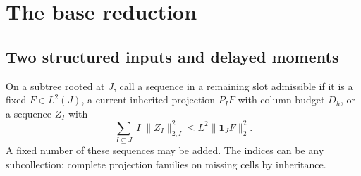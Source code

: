 \documentclass[11pt]{article}
\theoremstyle{definition}
\newcommand{\one}{\mathbf 1}
\numberwithin{equation}{section}
\begin{document}
\section{The base reduction}\label{sec:base}
\subsection{Two structured inputs and delayed moments}
On a subtree rooted at $J$, call a sequence in a remaining slot admissible if it is a fixed $F\in L^2(J)$, a current inherited projection $P_IF$ with column budget $D_h$, or a sequence $Z_I$ with
\[
 \sum_{I\subseteq J}|I|\|Z_I\|_{2,I}^2\le L^2\|\one_JF\|_2^2.
\]
A fixed number of these sequences may be added. The indices can be any subcollection; complete projection families on missing cells by inheritance.
\end{document}

